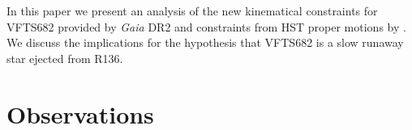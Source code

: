\documentclass[apjl,twocolumn]{emulateapj}
\begin{document}

In this paper we present an analysis of the new kinematical
constraints for VFTS682 provided by \emph{Gaia} DR2 and constraints
from HST proper motions  by \citet{platais:18}.   We discuss the
implications for the hypothesis that VFTS682 is a slow runaway star
ejected from R136.




\section{Observations}
\label{sec:sample}
\end{document}
